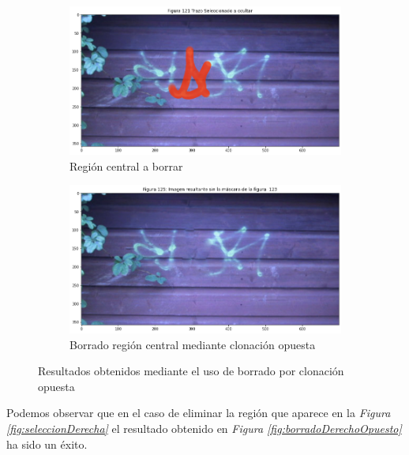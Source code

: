 \documentclass[11pt,twoside,titlepage,a4paper]{article}
\numberwithin{equation}{section} %
\theoremstyle{usual}
\begin{document}
\begin{figure}[h]
    \centering
    \begin{subfigure}[t]{.45\textwidth}
        \centering
        \includegraphics[width=\textwidth]{imagenes/PoissonImageEditing_cell_120_output_0.png}
        \caption{Región central a borrar}
        \label{fig:seleccionCentral}
    \end{subfigure}
    \centering
    \begin{subfigure}[t]{.45\textwidth}
        \centering
        \includegraphics[width=\textwidth]{imagenes/PoissonImageEditing_cell_120_output_3.png}
        \caption{Borrado región central mediante clonación opuesta}
        \label{fig:borradoCentralOpuesto}
    \end{subfigure}
    \caption{Resultados obtenidos mediante el uso de borrado por clonación opuesta}
    \label{fig:resultadosClonacionOpuesta}
\end{figure}

Podemos observar que en el caso de eliminar la región que aparece en la \textit{Figura \ref{fig:seleccionDerecha}} el resultado obtenido en \textit{Figura \ref{fig:borradoDerechoOpuesto}} ha sido un éxito.   
\end{document}
